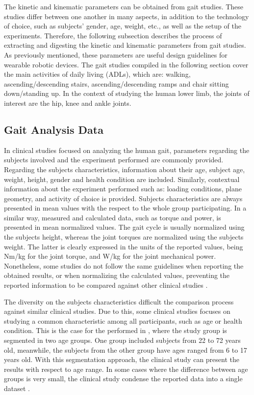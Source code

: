 The kinetic and kinematic parameters can be obtained from gait studies. These studies differ between one another in many aspects, in addition to the technology of choice, such as subjects' gender, age, weight, etc., as well as the setup of the experiments. Therefore, the following subsection describes the process of extracting and digesting the kinetic and kinematic parameters from gait studies. As previously mentioned, these parameters are useful design guidelines for wearable robotic devices. The gait studies compiled in the following section cover the main activities of daily living (ADLs), which are: walking, ascending/descending stairs, ascending/descending ramps and chair sitting down/standing up. In the context of studying the human lower limb, the joints of interest are the hip, knee and ankle joints.


\subsection{Gait Analysis Data}

In clinical studies focused on analyzing the human gait, parameters regarding the subjects involved and the experiment performed are commonly provided. Regarding the subjects characteristics, information about their age, subject age, weight, height, gender and health condition are included. Similarly, contextual information about the experiment performed such as: loading conditions, plane geometry, and activity of choice is provided. Subjects characteristics are always presented in mean values with the respect to the whole group participating. In a similar way, measured and calculated data, such as torque and power, is presented in mean normalized values. The gait cycle is usually normalized using the subjects height, whereas the joint torques are normalized using the subjects weight. The latter is clearly expressed in the units of the reported values, being Nm/kg for the joint torque, and W/kg for the joint mechanical power. Nonetheless, some studies do not follow the same guidelines when reporting the obtained results, or when normalizing the calculated values, preventing the reported information to be compared against other clinical studies \cite{lee2008biomechanics}. 

The diversity on the subjects characteristics difficult the comparison process against similar clinical studies. Due to this, some clinical studies focuses on studying a common characteristic among all participants, such as age or health condition. This is the case for the performed in \cite{bovi2011multiple}, where the study group is segmented in two age groups. One group included subjects from 22 to 72 years old, meanwhile, the subjects from the other group have ages ranged from 6 to 17 years old. With this segmentation approach, the clinical study can present the results with respect to age range. In some cases where the difference between age groups is very small, the clinical study condense the reported data into a single dataset \cite{lee2008biomechanics}.

